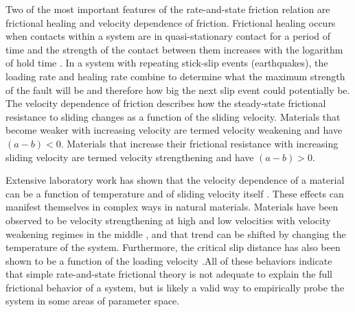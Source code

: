 Two of the most important features of the rate-and-state friction relation are frictional healing and velocity dependence of friction. Frictional healing occurs when contacts within a system are in quasi-stationary contact for a period of time and the strength of the contact between them increases with the logarithm of hold time \cite{dieterich1972time,marone1998laboratory}. In a system with repeating stick-slip events (earthquakes), the loading rate and healing rate combine to determine what the maximum strength of the fault will be and therefore how big the next slip event could potentially be. The velocity dependence of friction describes how the steady-state frictional resistance to sliding changes as a function of the sliding velocity. Materials that become weaker with increasing velocity are termed velocity weakening and have $(a-b) < 0$. Materials that increase their frictional resistance with increasing sliding velocity are termed velocity strengthening and have $(a-b) > 0$.

Extensive laboratory work has shown that the velocity dependence of a material can be a function of temperature \cite{BLANPIED1987,Mitchell2013} and of sliding velocity itself \cite{Ikari2009}. These effects can manifest themselves in complex ways in natural materials. Materials have been observed to be velocity strengthening at high and low velocities with velocity weakening regimes in the middle \cite{den2012new,den2013influence}, and that trend can be shifted by changing the temperature of the system. Furthermore, the critical slip distance has also been shown to be a function of the loading velocity \cite{Mair1999}.All of these behaviors indicate that simple rate-and-state frictional theory is not adequate to explain the full frictional behavior of a system, but is likely a valid way to empirically probe the system in some areas of parameter space.

